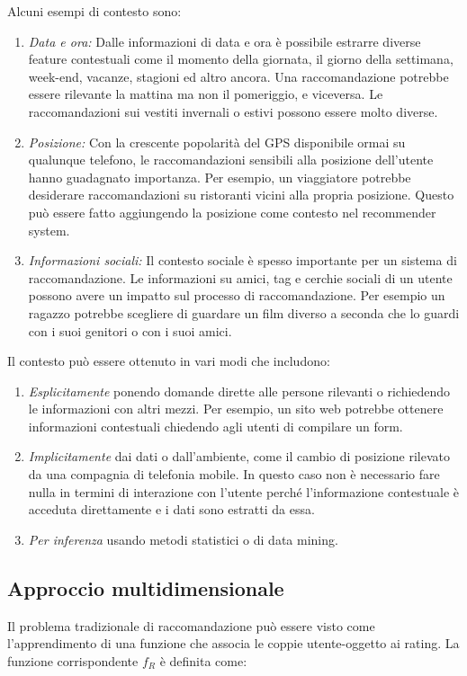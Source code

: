\noindent Alcuni esempi di contesto sono:
\begin{enumerate}
 \item \textit{Data e ora:} Dalle informazioni di data e ora è possibile estrarre diverse feature contestuali come il momento della giornata, il giorno della settimana, week-end, vacanze, stagioni ed altro ancora. Una raccomandazione potrebbe essere rilevante la mattina ma non il pomeriggio, e viceversa. Le raccomandazioni sui vestiti invernali o estivi possono essere molto diverse.
 \item \textit{Posizione:} Con la crescente popolarità del GPS disponibile ormai su qualunque telefono, le raccomandazioni sensibili alla posizione dell'utente hanno guadagnato importanza. Per esempio, un viaggiatore potrebbe desiderare raccomandazioni su ristoranti vicini alla propria posizione. Questo può essere fatto aggiungendo la posizione come contesto nel recommender system.
 \item \textit{Informazioni sociali:} Il contesto sociale è spesso importante per un sistema di raccomandazione. Le informazioni su amici, tag e cerchie sociali di un utente possono avere un impatto sul processo di raccomandazione. Per esempio un ragazzo potrebbe scegliere di guardare un film diverso a seconda che lo guardi con i suoi genitori o con i suoi amici.
\end{enumerate} 

\noindent Il contesto può essere ottenuto in vari modi \cite{recsys-handbook} che includono:
\begin{enumerate}
 \item \textit{Esplicitamente} ponendo domande dirette alle persone rilevanti o richiedendo le informazioni con altri mezzi. Per esempio, un sito web potrebbe ottenere informazioni contestuali chiedendo agli utenti di compilare un form.
 \item \textit{Implicitamente} dai dati o dall'ambiente, come il cambio di posizione rilevato da una compagnia di telefonia mobile. In questo caso non è necessario fare nulla in termini di interazione con l'utente perché l'informazione contestuale è acceduta direttamente e i dati sono estratti da essa.
 \item \textit{Per inferenza} usando metodi statistici o di data mining. 
\end{enumerate}

\subsection{Approccio multidimensionale}
Il problema tradizionale di raccomandazione può essere visto come l'apprendimento di una funzione che associa le coppie utente-oggetto ai rating. La funzione corrispondente $f_R$ è definita come:

